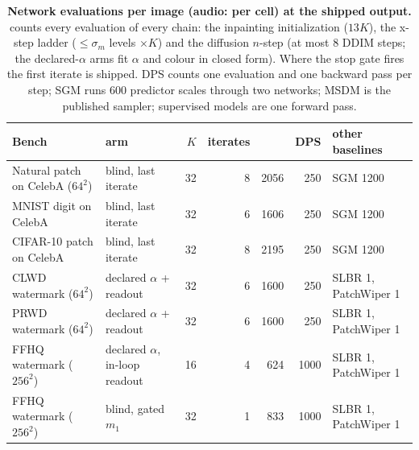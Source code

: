 \begin{table}[t]
    \centering
    \caption{\textbf{Network evaluations per image (audio: per cell) at the shipped output.} \method{} counts every evaluation of every chain: the inpainting initialization ($13K$), the x-step ladder ($\le\sigma_m$ levels $\times K$) and the diffusion $n$-step (at most 8 DDIM steps; the declared-$\alpha$ arms fit $\alpha$ and colour in closed form). Where the stop gate fires the first iterate is shipped. DPS counts one evaluation and one backward pass per step; SGM runs 600 predictor scales through two networks; MSDM is the published sampler; supervised models are one forward pass.}
    \label{tab:nfe}
    \small
    \setlength{\tabcolsep}{4pt}
    \begin{tabular}{@{}llrrrrl@{}}
        \toprule
        \textbf{Bench} & \textbf{\method{} arm} & $K$ & \textbf{iterates} & \textbf{\method{}} & \textbf{DPS} & \textbf{other baselines} \\
        \midrule
        Natural patch on CelebA ($64^2$) & blind, last iterate & 32 & 8 & 2056 & 250 & SGM 1200 \\
        MNIST digit on CelebA & blind, last iterate & 32 & 6 & 1606 & 250 & SGM 1200 \\
        CIFAR-10 patch on CelebA & blind, last iterate & 32 & 8 & 2195 & 250 & SGM 1200 \\
        \midrule
        CLWD watermark ($64^2$) & declared $\alpha$ + readout & 32 & 6 & 1600 & 250 & SLBR 1, PatchWiper 1 \\
        PRWD watermark ($64^2$) & declared $\alpha$ + readout & 32 & 6 & 1600 & 250 & SLBR 1, PatchWiper 1 \\
        FFHQ watermark ($256^2$) & declared $\alpha$, in-loop readout & 16 & 4 & 624 & 1000 & SLBR 1, PatchWiper 1 \\
        FFHQ watermark ($256^2$) & blind, gated $m_1$ & 32 & 1 & 833 & 1000 & SLBR 1, PatchWiper 1 \\

\end{tabular}
\end{table}
